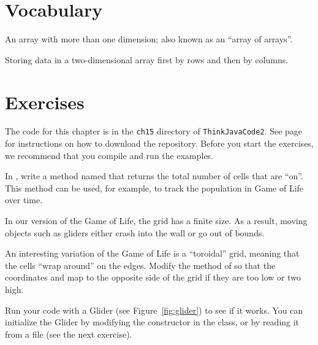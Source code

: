 \section{Vocabulary}

\begin{description}

An array with more than one dimension; also known as an ``array of arrays''.

Storing data in a two-dimensional array first by rows and then by columns.

\end{description}


\section{Exercises}

The code for this chapter is in the {\tt ch15} directory of {\tt ThinkJavaCode2}.
See page~\pageref{code} for instructions on how to download the repository.
Before you start the exercises, we recommend that you compile and run the examples.


\begin{exercise}
In , write a method named  that returns the total number of cells that are ``on''.
This method can be used, for example, to track the population in Game of Life over time.
\end{exercise}


\begin{exercise}
In our version of the Game of Life, the grid has a finite size.
As a result, moving objects such as gliders either crash into the wall or go out of bounds.

An interesting variation of the Game of Life is a ``toroidal'' grid, meaning that the cells ``wrap around'' on the edges.
Modify the  method of  so that the coordinates  and  map to the opposite side of the grid if they are too low or two high.

Run your code with a Glider (see Figure~\ref{fig:glider}) to see if it works.
You can initialize the Glider by modifying the constructor in the  class, or by reading it from a file (see the next exercise).
\end{exercise}



